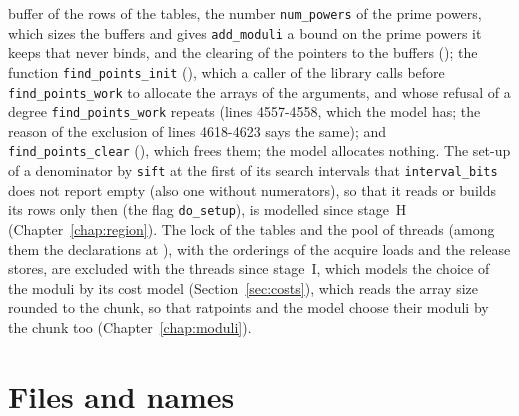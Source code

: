 buffer of the rows of the tables, the number \verb|num_powers| of the prime powers, which sizes the
buffers and gives \verb|add_moduli| a bound on the prime powers it keeps that never binds, and the
clearing of the pointers to the buffers (); the function
\verb|find_points_init| (), which a caller of the library calls
before \verb|find_points_work| to allocate the arrays of the arguments, and whose refusal of a
degree \verb|find_points_work| repeats (lines 4557-4558, which the model has; the reason of the
exclusion of lines 4618-4623 says the same); and \verb|find_points_clear|
(), which frees them; the model allocates nothing. The set-up of a
denominator by \verb|sift| at the first of its search intervals that \verb|interval_bits| does not
report empty (also one without numerators), so that it reads or builds its rows only then (the flag
\verb|do_setup|), is modelled since stage~H (Chapter~\ref{chap:region}). The lock of the tables and
the pool of threads (among them the declarations at ), with the
orderings of the acquire loads and the release stores, are excluded with the threads since stage~I,
which models the choice of the moduli by its cost model (Section~\ref{sec:costs}), which reads the
array size rounded to the chunk, so that ratpoints and the model choose their moduli by the chunk
too (Chapter~\ref{chap:moduli}).

\section{Files and names}\label{sec:rowsFiles}

